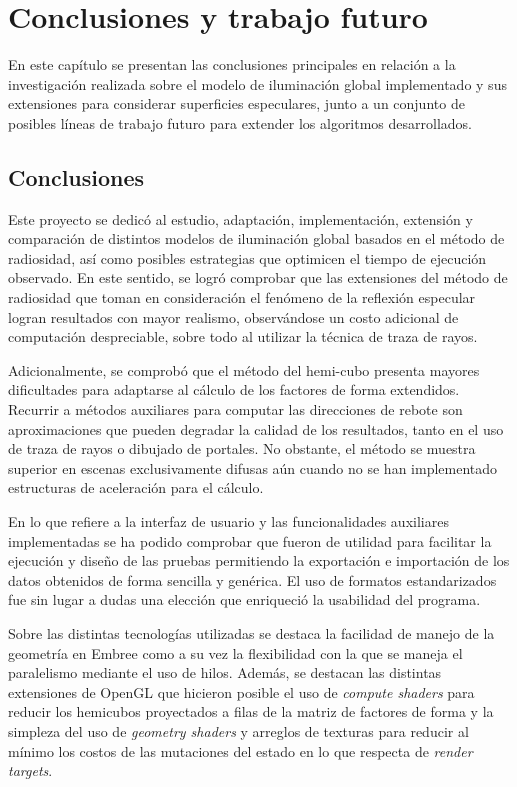 \chapter{Conclusiones y trabajo futuro}
\label{ch:chap06}

En este capítulo se presentan las conclusiones principales en relación a la investigación realizada sobre el modelo de iluminación global implementado y sus extensiones para considerar superficies especulares, junto a un conjunto de posibles líneas de trabajo futuro para extender los algoritmos desarrollados.

\section{Conclusiones}
\label{sec:conclusiones}

Este proyecto se dedicó al estudio, adaptación, implementación, extensión y comparación de distintos modelos de iluminación global basados en el método de radiosidad, así como posibles estrategias que optimicen el tiempo de ejecución observado. En este sentido, se logró comprobar que las extensiones del método de radiosidad que toman en consideración el fenómeno de la reflexión especular logran resultados con mayor realismo, observándose un costo adicional de computación despreciable, sobre todo al utilizar la técnica de traza de rayos.

Adicionalmente, se comprobó que el método del hemi-cubo presenta mayores dificultades para adaptarse al cálculo de los factores de forma extendidos. Recurrir a métodos auxiliares para computar las direcciones de rebote son aproximaciones que pueden degradar la calidad de los resultados, tanto en el uso de traza de rayos o dibujado de portales. No obstante, el método se muestra superior en escenas exclusivamente difusas aún cuando no se han implementado estructuras de aceleración para el cálculo.

En lo que refiere a la interfaz de usuario y las funcionalidades auxiliares implementadas se ha podido comprobar que fueron de utilidad para facilitar la ejecución y diseño de las pruebas permitiendo la exportación e importación de los datos obtenidos de forma sencilla y genérica. El uso de formatos estandarizados fue sin lugar a dudas una elección que enriqueció la usabilidad del programa.

Sobre las distintas tecnologías utilizadas se destaca la facilidad de manejo de la geometría en Embree como a su vez la flexibilidad con la que se maneja el paralelismo mediante el uso de hilos. Además, se destacan las distintas extensiones de OpenGL que hicieron posible el uso de \textit{compute shaders} para reducir los hemicubos proyectados a filas de la matriz de factores de forma y la simpleza del uso de \textit{geometry shaders} y arreglos de texturas para reducir al mínimo los costos de las mutaciones del estado en lo que respecta de \textit{render targets}.


